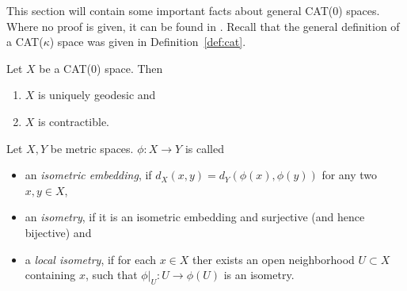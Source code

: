 
This section will contain some important facts about general CAT(0) spaces. Where no proof is given, it can be found in \cite{MR1744486}. Recall that the general definition of a CAT(\(\kappa\)) space was given in Definition~\ref{def:cat}. 

\begin{prop}[{\cite[Prop II.1.4]{MR1744486}}]
  Let \(X\) be a CAT(0) space. Then
  \begin{enumerate}
  \item \(X\) is uniquely geodesic and
  \item \(X\) is contractible.
  \end{enumerate}
\end{prop}

\begin{defin}
  Let \(X,Y\) be metric spaces. \(\phi \colon X \to Y\) is called
  \begin{itemize}
  \item an \emph{isometric embedding}, if \(d_X(x,y) = d_Y(\phi(x), \phi(y))\) for any two \(x,y \in X\),
  \item an \emph{isometry}, if it is an isometric embedding and surjective (and hence bijective) and
  \item a \emph{local isometry}, if for each \(x \in X\) ther exists an open neighborhood \(U \subset X\) containing \(x\), such that \(\phi|_U \colon U \to \phi(U)\) is an isometry.
  \end{itemize}
\end{defin}

